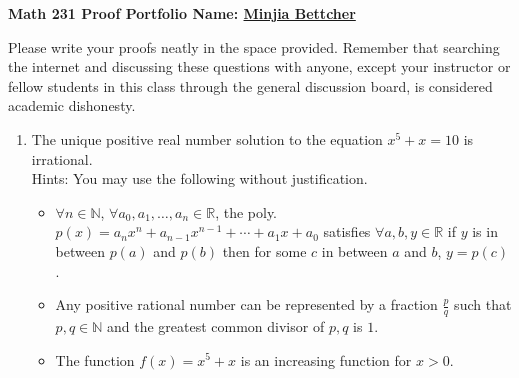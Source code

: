 \documentclass[12pt]{amsart}
\theoremstyle{definition}
\theoremstyle{remark}
\newcommand{\nats}{\mathbb N}
\newcommand{\reals}{\mathbb R}
\begin{document}
\thispagestyle{plain}

\begin{large}{\bf Math 231 \hfill{} Proof Portfolio\hfill{} Name: \underline{Minjia Bettcher}}\end{large}

Please write your proofs neatly in the space provided.  Remember that searching the internet and discussing these questions with anyone, except your instructor or fellow students in this class through the general discussion board, is considered academic dishonesty.\\

\begin{enumerate}
\item The unique positive real number solution to the equation $x^5+x=10$ is irrational.\\

Hints:  You may use the following without justification. \\ \begin{itemize}

\item $\forall n\in\nats$, $\forall a_0,a_1,\ldots, a_n\in\reals$, the poly. $p(x)=a_n x^n +a_{n-1} x^{n-1}+\cdots +a_1 x+a_0$ satisfies $\forall a,b,y\in\reals$ if $y$ is in between $p(a)$ and $p(b)$ then for some $c$ in between $a$ and $b$, $y=p(c)$.\\

\item  Any positive rational number can be represented by a fraction $\frac{p}{q}$ such that $p,q\in\nats$ and the greatest common divisor of $p,q$ is $1$.\\

\item  The function $f(x)=x^5+x$ is an increasing function for $x>0$.

\end{itemize}

\bigskip
\bigskip


\end{enumerate}
\end{document}

